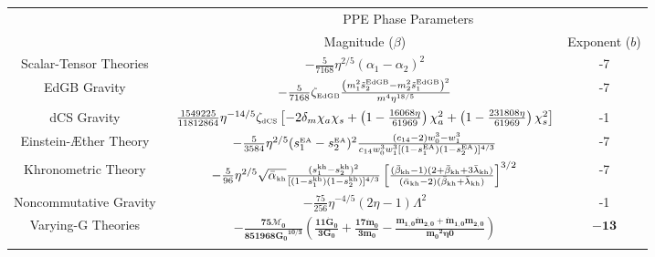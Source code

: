 \documentclass[prd,twocolumn,nofootinbib]{revtex4-1}
\newcommand{\EDGB}{{\mbox{\tiny EdGB}}}
\newcommand{\KG}{{\mbox{\tiny kh}}}
\newcommand{\EA}{{\mbox{\tiny EA}}}
\newcommand{\DCS}{{\mbox{\tiny dCS}}}
\begin{document}
{
\newcommand{\minitab}[2][l]{\begin{tabular}{#1}#2\end{tabular}}
\renewcommand{\arraystretch}{2.}
\begingroup 
\begin{table*}[htb]
\begin{centering}
\begin{tabular}{c|c|c}
\hline
\hline
\noalign{\smallskip}
\multirow{2}{*}{Theories}&\multicolumn{2}{c}{PPE Phase Parameters}\\ \cline{2-3}
& Magnitude ($\beta$)   & Exponent ($b$)  \\ \hline
Scalar-Tensor Theories~\cite{Horbatsch:2011ye}&$-\frac{5}{7168}\eta ^{2/5}(\alpha_1-\alpha_2)^2$&-7\\ \hline
EdGB Gravity~\cite{Yagi:2011xp}&$-\frac{5}{7168}\zeta_\EDGB\frac{\left(m_1^2\tilde s_2^\EDGB-m_2^2\tilde s_1^\EDGB\right)^2}{m^4\eta^{18/5}}$&-7\\ \hline
dCS Gravity~\cite{Yagi:2012vf,Yunes:2016jcc}&$\frac{1549225}{11812864}\eta ^{-14/5} \zeta_{\DCS} \left[-2 \delta_m \chi_a \chi_s+\left(1-\frac{16068 \eta }{61969}\right)\chi_a^2 +\left(1-\frac{231808 \eta }{61969}\right)\chi_s^2\right]
$&-1\\ \hline
Einstein-\AE ther Theory~\cite{Hansen:2014ewa}& $-\frac{5}{3584}\eta ^{2/5} (s_1^\EA-s_2^\EA)^2\frac{(c_{14}-2) w_0^3-w_1^3}{c_{14} w_0^3 w_1^3 [(1-s_1^\EA) (1-s_2^\EA)]^{4/3}}$  & -7\\ \hline
Khronometric Theory~\cite{Hansen:2014ewa}&$-\frac{5}{96} \eta ^{2/5}\sqrt{\bar \alpha_{\KG}}\frac{(s_1^\KG-s_2^\KG)^2}{[(1-s_1^\KG) (1-s_2^\KG)]^{4/3}} \left[\frac{(\bar \beta_{\KG}-1)(2+\bar \beta_{\KG}+3\bar \lambda_{\KG})}{(\bar \alpha_{\KG}-2)(\bar \beta_{\KG}+\bar \lambda_{\KG})}\right]^{3/2}$&-7\\ \hline 
Noncommutative Gravity~\cite{Kobakhidze:2016cqh}& $-\frac{75}{256}\eta ^{-4/5}(2 \eta -1) \Lambda ^2$ &-1\\ \hline
Varying-G Theories~\cite{Yunes:2009bv}&$\mathbf{-\frac{75 \mathcal{M}_0}{851968 {G_0}^{10/3}}\left(\frac{11 \dot{G}_0}{3 G_0}+ \frac{17 \dot{m}_0}{3m_0}- \frac{m_{1,0}\dot{m}_{2,0}+\dot{m}_{1,0}m_{2,0}}{{m_0}^2 \eta0}\right)}$&$ \mathbf{-13}$\\ 
\noalign{\smallskip}
\hline
\hline
\end{tabular}
\end{centering}

\end{table*}}
\end{document}
